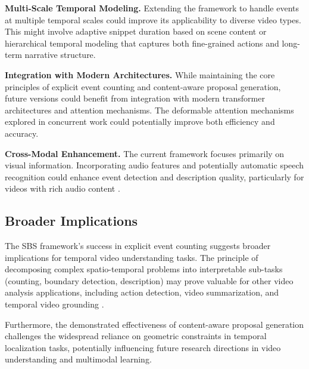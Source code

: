 \textbf{Multi-Scale Temporal Modeling.}
Extending the framework to handle events at multiple temporal scales could improve its applicability to diverse video types. This might involve adaptive snippet duration based on scene content or hierarchical temporal modeling that captures both fine-grained actions and long-term narrative structure.

\textbf{Integration with Modern Architectures.}
While maintaining the core principles of explicit event counting and content-aware proposal generation, future versions could benefit from integration with modern transformer architectures and attention mechanisms. The deformable attention mechanisms explored in concurrent work \cite{zhu2021deformable} could potentially improve both efficiency and accuracy.

\textbf{Cross-Modal Enhancement.}
The current framework focuses primarily on visual information. Incorporating audio features and potentially automatic speech recognition could enhance event detection and description quality, particularly for videos with rich audio content \cite{iashin2020better,akbari2021vatt}.

\subsection{Broader Implications}

The SBS framework's success in explicit event counting suggests broader implications for temporal video understanding tasks.
The principle of decomposing complex spatio-temporal problems into interpretable sub-tasks (counting, boundary detection, description) may prove valuable for other video analysis applications, including action detection, video summarization, and temporal video grounding \cite{Gao2017-ij,yuan2019temporal}.

Furthermore, the demonstrated effectiveness of content-aware proposal generation challenges the widespread reliance on geometric constraints in temporal localization tasks, potentially influencing future research directions in video understanding and multimodal learning.